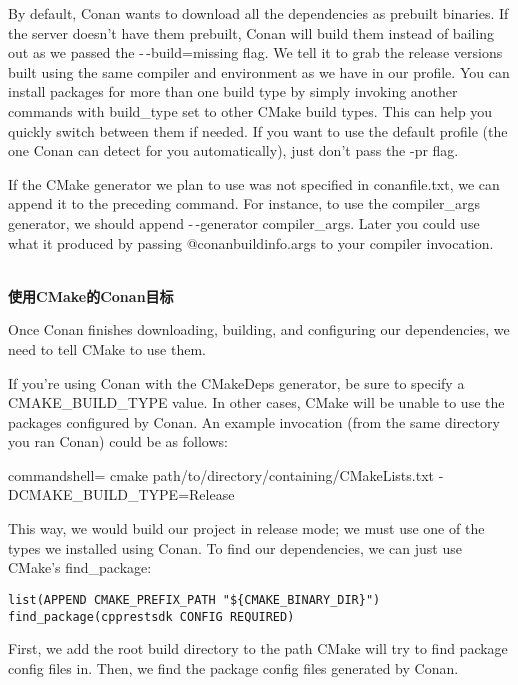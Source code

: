 By default, Conan wants to download all the dependencies as prebuilt binaries. If the server doesn't have them prebuilt, Conan will build them instead of bailing out as we passed the -\,-build=missing flag. We tell it to grab the release versions built using the same compiler and environment as we have in our profile. You can install packages for more than one build type by simply invoking another commands with build\_type set to other CMake build types. This can help you quickly switch between them if needed. If you want to use the default profile (the one Conan can detect for you automatically), just don't pass the -pr flag.

If the CMake generator we plan to use was not specified in conanfile.txt, we can append it to the preceding command. For instance, to use the compiler\_args generator, we should append -\,-generator compiler\_args. Later you could use what it produced by passing @conanbuildinfo.args to your compiler invocation.

\hspace*{\fill} \\ %
\noindent
\textbf{使用CMake的Conan目标}

Once Conan finishes downloading, building, and configuring our dependencies, we need to tell CMake to use them. 

If you're using Conan with the CMakeDeps generator, be sure to specify a CMAKE\_BUILD\_TYPE value. In other cases, CMake will be unable to use the packages configured by Conan. An example invocation (from the same directory you ran Conan) could be as follows:

\begin{tcblisting}{commandshell={}}
cmake path/to/directory/containing/CMakeLists.txt -
DCMAKE_BUILD_TYPE=Release
\end{tcblisting}

This way, we would build our project in release mode; we must use one of the types we installed using Conan. To find our dependencies, we can just use CMake's find\_package:

\begin{lstlisting}[style=styleCMake]
list(APPEND CMAKE_PREFIX_PATH "${CMAKE_BINARY_DIR}")
find_package(cpprestsdk CONFIG REQUIRED)
\end{lstlisting}

First, we add the root build directory to the path CMake will try to find package config files in. Then, we find the package config files generated by Conan.

